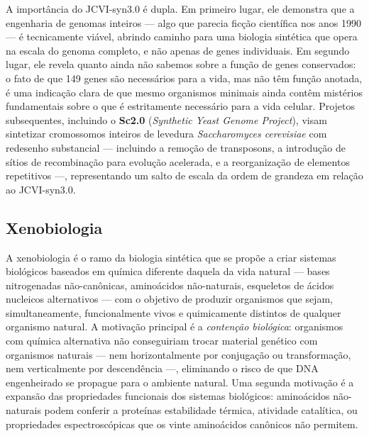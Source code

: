 A importância do JCVI-syn3.0 é dupla. Em primeiro lugar, ele demonstra que a engenharia de genomas inteiros --- algo que parecia ficção científica nos anos 1990 --- é tecnicamente viável, abrindo caminho para uma biologia sintética que opera na escala do genoma completo, e não apenas de genes individuais. Em segundo lugar, ele revela quanto ainda não sabemos sobre a função de genes conservados: o fato de que 149 genes são necessários para a vida, mas não têm função anotada, é uma indicação clara de que mesmo organismos minimais ainda contêm mistérios fundamentais sobre o que é estritamente necessário para a vida celular. Projetos subsequentes, incluindo o \textbf{Sc2.0} (\emph{Synthetic Yeast Genome Project}), visam sintetizar cromossomos inteiros de levedura \textit{Saccharomyces cerevisiae} com redesenho substancial --- incluindo a remoção de transposons, a introdução de sítios de recombinação para evolução acelerada, e a reorganização de elementos repetitivos ---, representando um salto de escala da ordem de grandeza em relação ao JCVI-syn3.0.

\subsection{Xenobiologia}

A xenobiologia é o ramo da biologia sintética que se propõe a criar sistemas biológicos baseados em química diferente daquela da vida natural --- bases nitrogenadas não-canônicas, aminoácidos não-naturais, esqueletos de ácidos nucleicos alternativos --- com o objetivo de produzir organismos que sejam, simultaneamente, funcionalmente vivos e quimicamente distintos de qualquer organismo natural. A motivação principal é a \emph{contenção biológica}: organismos com química alternativa não conseguiriam trocar material genético com organismos naturais --- nem horizontalmente por conjugação ou transformação, nem verticalmente por descendência ---, eliminando o risco de que DNA engenheirado se propague para o ambiente natural. Uma segunda motivação é a expansão das propriedades funcionais dos sistemas biológicos: aminoácidos não-naturais podem conferir a proteínas estabilidade térmica, atividade catalítica, ou propriedades espectroscópicas que os vinte aminoácidos canônicos não permitem.

